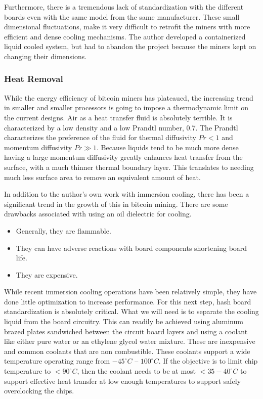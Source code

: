 \documentclass[runningheads]{llncs}
\begin{document}
Furthermore, there is a tremendous lack of standardization with the different boards even with the same model from the same manufacturer.
These small dimensional fluctuations, make it very difficult to retrofit the miners with more efficient and dense cooling mechanisms.
The author developed a containerized liquid cooled system, but had to abandon the project because the miners kept on changing their dimensions.

\subsubsection{Heat Removal}
While the energy efficiency of bitcoin miners has plateaued, the increasing trend in smaller and smaller processors is going to impose a thermodynamic limit on the current designs.
Air as a heat transfer fluid is absolutely terrible.
It is characterized by a low density and a low Prandtl number, 0.7.
The Prandtl characterizes the preference of the fluid for thermal diffusivity $Pr < 1$ and momentum diffusivity $Pr \gg 1$.
Because liquids tend to be much more dense having a large momentum diffusivity greatly enhances heat transfer from the surface, with a much thinner thermal boundary layer.
This translates to needing much less surface area to remove an equivalent amount of heat.

In addition to the author's own work with immersion cooling, there has been a significant trend in the growth of this in bitcoin mining.
There are some drawbacks associated with using an oil dielectric for cooling.
\begin{itemize}
    \item Generally, they are flammable.
    \item They can have adverse reactions with board components shortening board life.
    \item They are expensive.
\end{itemize}

While recent immersion cooling operations have been relatively simple, they have done little optimization to increase performance.
For this next step, hash board standardization is absolutely critical.
What we will need is to separate the cooling liquid from the board circuitry.
This can readily be achieved using aluminum brazed plates sandwiched between the circuit board layers and using a coolant like either pure water or an ethylene glycol water mixture.
These are inexpensive and common coolants that are non combustible.
These coolants support a wide temperature operating range from $-45^{\circ}C$ -- $100^{\circ}C$.
If the objective is to limit chip temperature to $<90^{\circ}C$, then the coolant needs to be at most $<35-40^{\circ}C$ to support effective heat transfer at low enough temperatures to support safely overclocking the chips.
\end{document}
